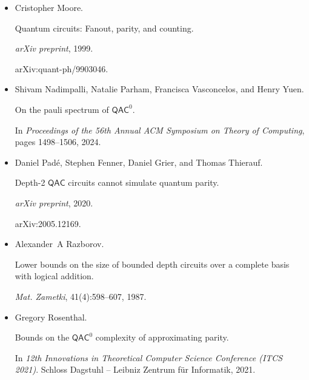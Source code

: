 \begin{itemize}
Multiparticle entanglement of hot trapped ions.


\emph{Physical Review Letters}, 82(9):1835, 1999.





\item[] 
[17]

Cristopher Moore.


Quantum circuits: Fanout, parity, and counting.


\emph{arXiv preprint}, 1999.


arXiv:quant-ph/9903046.





\item[] 
[18]

Shivam Nadimpalli, Natalie Parham, Francisca Vasconcelos, and Henry Yuen.


On the pauli spectrum of ${\mathsf{QAC}}^{0}$.


In \emph{Proceedings of the 56th Annual ACM Symposium on Theory of
Computing}, pages 1498–1506, 2024.





\item[] 
[19]

Daniel Padé, Stephen Fenner, Daniel Grier, and Thomas Thierauf.


Depth-2 ${\mathsf{QAC}}$ circuits cannot simulate quantum parity.


\emph{arXiv preprint}, 2020.


arXiv:2005.12169.





\item[] 
[20]

Alexander A Razborov.


Lower bounds on the size of bounded depth circuits over a complete
basis with logical addition.


\emph{Mat. Zametki}, 41(4):598–607, 1987.





\item[] 
[21]

Gregory Rosenthal.


Bounds on the ${\mathsf{QAC}}^{0}$ complexity of approximating parity.


In \emph{12th Innovations in Theoretical Computer Science Conference
(ITCS 2021)}. Schloss Dagstuhl – Leibniz Zentrum für Informatik, 2021.



\end{itemize}
